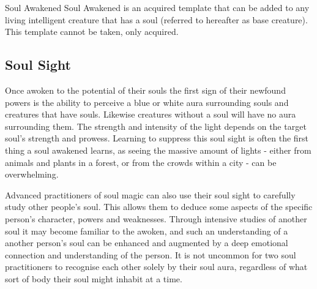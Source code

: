 \begin{35e}{Soul Awakened}
Soul Awakened is an acquired template that can be added to any living
intelligent creature that has a soul (referred to hereafter as base
creature). This template cannot be taken, only acquired.
\end{35e}

\subsection{Soul Sight}
\label{sec:Soul Sight}

Once awoken to the potential of their souls the first sign of their newfound
powers is the ability to perceive a blue or white aura surrounding souls and
creatures that have souls. Likewise creatures without a soul will have no aura
surrounding them. The strength and intensity of the light depends on the
target soul's strength and prowess.  Learning to suppress this soul sight is
often the first thing a soul awakened learns, as seeing the massive amount of
lights - either from animals and plants in a forest, or from the crowds within
a city - can be overwhelming.

Advanced practitioners of soul magic can also use their soul sight to
carefully study other people's soul. This allows them to deduce some aspects
of the specific person's character, powers and weaknesses. Through intensive
studies of another soul it may become familiar to the awoken, and such an
understanding of a another person's soul can be enhanced and augmented by a
deep emotional connection and understanding of the person. It is not uncommon
for two soul practitioners to recognise each other solely by their soul aura,
regardless of what sort of body their soul might inhabit at a time.

